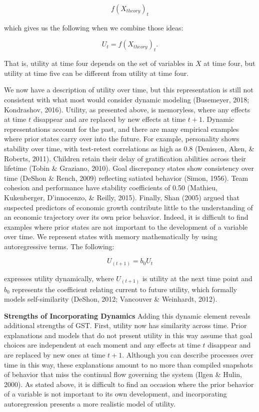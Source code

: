 \documentclass[english,man]{apa6}
\theoremstyle{definition}
\theoremstyle{definition}
\theoremstyle{definition}
\theoremstyle{remark}
\begin{document}
\begin{equation}
f(X_{theory})_{t}
\end{equation}

\noindent which gives us the following when we combine those ideas:

\begin{equation}
U_{t} = f(X_{theory})_{t}.
\end{equation}

\noindent That is, utility at time four depends on the set of variables
in \(X\) at time four, but utility at time five can be different from
utility at time four.

We now have a description of utility over time, but this representation
is still not consistent with what most would consider dynamic modeling
(Busemeyer, 2018; Kondrashov, 2016). Utility, as presented above, is
memoryless, where any effects at time \(t\) disappear and are replaced
by new effects at time \(t+1\). Dynamic representations account for the
past, and there are many empirical examples where prior states carry
over into the future. For example, personality shows stability over
time, with test-retest correlations as high as 0.8 (Denissen, Aken, \&
Roberts, 2011). Children retain their delay of gratification abilities
across their lifetime (Tobin \& Graziano, 2010). Goal discrepancy states
show consistency over time (DeShon \& Rench, 2009) reflecting satiated
behavior (Simon, 1956). Team cohesion and performance have stability
coefficients of 0.50 (Mathieu, Kukenberger, D'innocenzo, \& Reilly,
2015). Finally, Shan (2005) argued that suspected predictors of economic
growth contribute little to the understanding of an economic trajectory
over its own prior behavior. Indeed, it is difficult to find examples
where prior states are not important to the development of a variable
over time. We represent states with memory mathematically by using
autoregressive terms. The following:

\begin{equation}
U_{(t+1)} = b_0 U_{t}
\end{equation}

\noindent expresses utility dynamically, where \(U_{(t+1)}\) is utility
at the next time point and \(b_0\) represents the coefficient relating
current to future utility, which formally models self-similarity
(DeShon, 2012; Vancouver \& Weinhardt, 2012).

\textbf{Strengths of Incorporating Dynamics} Adding this dynamic element
reveals additional strengths of GST. First, utility now has similarity
across time. Prior explanations and models that do not present utility
in this way assume that goal choices are independent at each moment and
any effects at time \(t\) disappear and are replaced by new ones at time
\(t+1\). Although you can describe processes over time in this way,
these explanations amount to no more than compiled snapshots of behavior
that miss the continual flow governing the system (Ilgen \& Hulin,
2000). As stated above, it is difficult to find an occasion where the
prior behavior of a variable is not important to its own development,
and incorporating autoregression presents a more realistic model of
utility.
\end{document}
